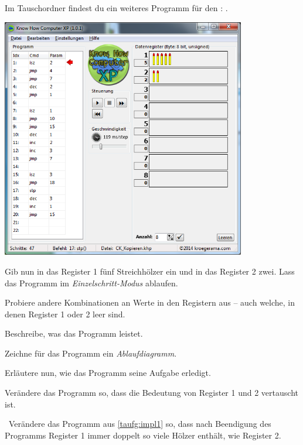 \documentclass[10pt, a4paper, ngerman]{arbeitsblatt}
\begin{document}
\ReiheTitel

\begin{aufgabe}[icon=\iconLaptop]
	Im Tauschordner findest du ein weiteres Programm für den : .

	\begin{center}
		\includegraphics[width=0.8\textwidth]{9Diff-AB.III.3-Abb-1}
	\end{center}

	\begin{teilaufgaben}
		\teilaufgabe Gib nun in das Register 1 fünf Streichhölzer ein und in das Register 2
		zwei. Lass das Programm im \emph{Einzelschritt-Modus} ablaufen.

		\teilaufgabe Probiere andere Kombinationen an Werte in den Registern aus – auch
		welche, in denen Register 1 oder 2 leer sind.

		\teilaufgabe Beschreibe, was das Programm leistet.

		\teilaufgabe Zeichne für das Programm ein \emph{Ablaufdiagramm}.

		\teilaufgabe Erläutere nun, wie das Programm seine Aufgabe erledigt.

			{}

		\teilaufgabe\label{taufg:impl1} Verändere das Programm so, dass die Bedeutung von
		Register 1 und 2 vertauscht ist.

		\teilaufgabe\iconStern\ Verändere das Programm aus \ref{taufg:impl1} so, dass
		nach Beendigung des Programms Register 1 immer doppelt so viele Hölzer enthält,
		wie Register 2.
	\end{teilaufgaben}
\end{aufgabe}
\end{document}
